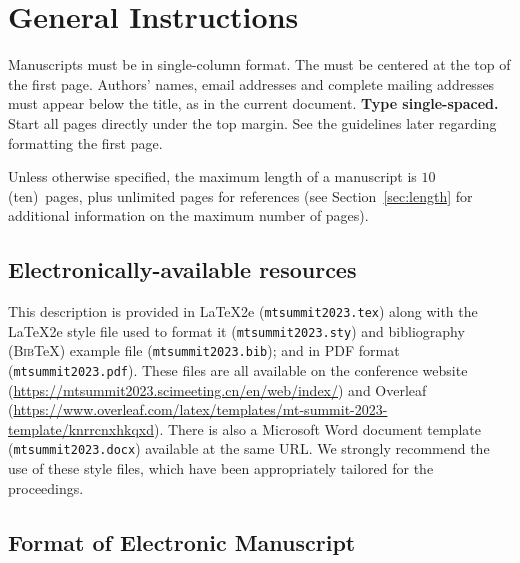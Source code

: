 \documentclass[]{article}
\newcommand{\conffilename}{mtsummit2023}
\newcommand{\downloadsite}{\protect\url{https://mtsummit2023.scimeeting.cn/en/web/index/}}
\newcommand{\overleaftemplate}
{\protect\url{https://www.overleaf.com/latex/templates/mt-summit-2023-template/knrrcnxhkqxd}}
\newcommand{\paperlength}{$10$ (ten)}
\newcommand{\shortpaperlength}{$6$ (six)}
\begin{document}
\section{General Instructions}

Manuscripts must be in single-column format. The {}
must be centered at the top of the first page. Authors' names, email
addresses and complete mailing addresses must appear below the title,
as in the current document. {\bf Type single-spaced.}  Start all pages
directly under the top margin. See the guidelines later regarding
formatting the first page.

Unless otherwise specified, the maximum length of a manuscript is
\paperlength~pages, plus unlimited pages for references
(see Section~\ref{sec:length} for additional information on the
maximum number of pages).

\subsection{Electronically-available resources}

This description is provided in \LaTeX2e (\nobreak\texttt{\conffilename.tex})
along with the \LaTeX2e style file used to format it
(\nobreak\texttt{\conffilename.sty}) and bibliography
(\textsc{Bib}\TeX) example file (\nobreak\texttt{\conffilename.bib}); and in
PDF format (\nobreak\texttt{\conffilename.pdf}).
These files are all
available on the conference website (\downloadsite)
and Overleaf (\overleaftemplate).
There is also a Microsoft Word document
template (\nobreak\texttt{\conffilename.docx}) available at the same URL. We
strongly re\-commend the use of these style files, which have been
appropriately tailored for the proceedings.


\subsection{Format of Electronic Manuscript}
\label{sect:pdf}
\end{document}

